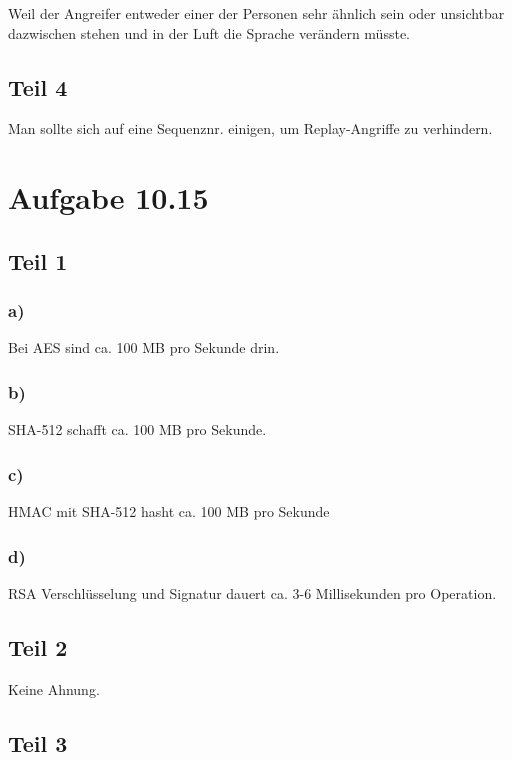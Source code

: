 \documentclass[10pt,a4paper]{article}
\begin{document}
Weil der Angreifer entweder einer der Personen sehr ähnlich sein oder unsichtbar
dazwischen stehen und in der Luft die Sprache verändern müsste.

\subsection{Teil 4}

Man sollte sich auf eine Sequenznr. einigen, um Replay-Angriffe zu verhindern.

\section{Aufgabe 10.15}

\subsection{Teil 1}

\subsubsection{a)}

Bei AES sind ca. 100 MB pro Sekunde drin.

\subsubsection{b)}

SHA-512 schafft ca. 100 MB pro Sekunde.

\subsubsection{c)}

HMAC mit SHA-512 hasht ca. 100 MB pro Sekunde

\subsubsection{d)}

RSA Verschlüsselung und Signatur dauert ca. 3-6 Millisekunden pro Operation.

\subsection{Teil 2}

Keine Ahnung.

\subsection{Teil 3}
\end{document}
